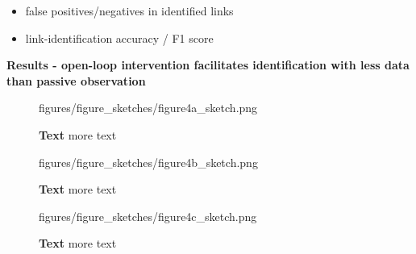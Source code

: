 \begin{itemize}
    \item false positives/negatives in identified links
    \item link-identification accuracy / F1 score
\end{itemize}


\textbf{Results - open-loop intervention facilitates identification with less data than passive observation}







\begin{figure}[ht]
	\centering
	 \begin{overpic}[width=.6\textwidth]{figures/figure_sketches/figure4a_sketch.png}
	  \end{overpic}
    \caption{\textbf{Text} more text}
    \label{fig:pipeline} %
 \end{figure}

\begin{figure}[ht]
	\centering
	 \begin{overpic}[width=.6\textwidth]{figures/figure_sketches/figure4b_sketch.png}
	  \end{overpic}
    \caption{\textbf{Text} more text}
    \label{fig:characterization} %
 \end{figure}


 \begin{figure}[ht]
 	\centering
 	 \begin{overpic}[width=.6\textwidth]{figures/figure_sketches/figure4c_sketch.png}
 	  \end{overpic}
     \caption{\textbf{Text} more text}
     \label{fig:res_summary} %
  \end{figure}
